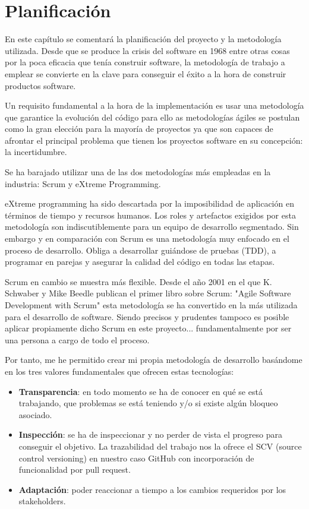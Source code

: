 \chapter{Planificación}
En este capítulo se comentará la planificación del proyecto y la metodología utilizada. 
Desde que se produce la crisis del software en 1968 entre otras cosas por la poca eficacia que 
tenía construir software, la metodología de trabajo a emplear se convierte en la clave para conseguir 
el éxito a la hora de construir productos software. 

Un requisito fundamental a la hora de la implementación es usar una metodología que garantice la evolución 
del código para ello as metodologías ágiles se postulan como la gran elección para la mayoría de proyectos 
ya que son capaces de afrontar el principal problema que tienen los proyectos software en su concepción: la incertidumbre. 

Se ha barajado utilizar una de las dos metodologías más empleadas en la industria: Scrum y eXtreme Programming. 

eXtreme programming ha sido descartada por la imposibilidad de aplicación en términos de tiempo y recursos humanos. 
Los roles y artefactos exigidos por esta metodología son indiscutiblemente para un equipo de desarrollo segmentado. 
Sin embargo y en comparación con Scrum es una metodología muy enfocado en el proceso de desarrollo. Obliga a desarrollar 
guiándose de pruebas (TDD), a programar en parejas y asegurar la calidad del código en todas las etapas.

Scrum en cambio se muestra más flexible. Desde  el año 2001 en el que K. Schwaber y Mike Beedle publican el primer 
libro sobre Scrum: "Agile Software Development with Scrum" esta metodología se ha convertido en la más utilizada 
para el desarrollo de software. Siendo precisos y prudentes tampoco es posible aplicar propiamente dicho Scrum en este proyecto... 
fundamentalmente por ser una persona a cargo de todo el proceso.

Por tanto, me he permitido crear mi propia metodología de desarrollo basándome en los tres valores fundamentales que ofrecen estas tecnologías:
\begin{itemize}
    \item \textbf{Transparencia}: en todo momento se ha de conocer en qué se está trabajando, que problemas se está teniendo y/o si 
    existe algún bloqueo asociado.
    \item \textbf{Inspección}: se ha de inspeccionar y no perder de vista el progreso para conseguir el objetivo. La 
    trazabilidad del trabajo nos la ofrece el SCV (source control versioning) en nuestro caso GitHub con incorporación de funcionalidad por pull request.
    \item \textbf{Adaptación}: poder reaccionar a tiempo a los cambios requeridos por los stakeholders.
\end{itemize}

